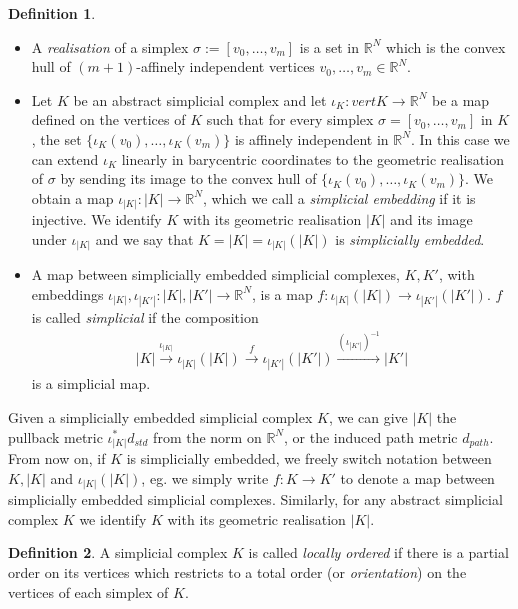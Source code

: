 \documentclass[a4paper,11pt]{article}
\theoremstyle{definition}
\newtheorem{definition}{Definition}[section]
\theoremstyle{plain}
\theoremstyle{remark}
\begin{document}
\begin{definition} \begin{itemize}
\item A \textit{realisation} of a simplex $\sigma:= [v_{0},\dots, v_{m}]$ is a set in $\mathbb{R}^N$ which is the convex hull of $(m+1)$-affinely independent vertices $v_{0},\dots, v_{m} \in \mathbb{R}^N$. 
\item Let $K$ be an abstract simplicial complex and let $\iota_K: vert K \rightarrow \mathbb{R}^N$ be a map defined on the vertices of $K$ such that for every simplex $\sigma = [v_{0},\dots, v_{m}]$ in $K$, the set $\{\iota_K(v_{0}),\dots,\iota_K(v_{m})\}$ is affinely independent in $\mathbb{R}^N$. In this case we can extend $\iota_K$ linearly in barycentric coordinates to the geometric realisation of $\sigma$ by sending its image to the convex hull of $\{\iota_K(v_{0}),\dots, \iota_K(v_{m})\}$.  We obtain a map  $\iota_{|K|}: |K|\rightarrow \mathbb{R}^N$, which we call a \textit{simplicial embedding} if it is injective. We identify $K$ with its geometric realisation $|K|$ and its image under $\iota_{|K|}$ and we say that $K= |K|= \iota_{|K|}(|K|)$ is \textit{simplicially embedded}.
\item A map between simplicially embedded simplicial complexes, $K,K'$, with embeddings $\iota_{|K|},\iota_{|K'|}: |K|,|K'|\rightarrow \mathbb{R}^N$, is a map $f: \iota_{|K|}(|K|) \rightarrow \iota_{|K'|}(|K'|)$. $f$ is called \textit{simplicial} if the composition 
\begin{align*}
|K|\xrightarrow{\iota_{|K|}} \iota_{|K|}(|K|) \xrightarrow{f} \iota_{|K'|}(|K'|) \xrightarrow{(\iota_{|K'|})^{-1}} |K'|
\end{align*}
is a simplicial map. 
\end{itemize}
\end{definition}

Given a simplicially embedded simplicial complex $K$, we can give $|K|$ the pullback metric $\iota^{*}_{|K|} d_{std}$ from the norm on $\mathbb{R}^N$, or the induced path metric $d_{path}$. From now on, if $K$ is simplicially embedded, we freely switch notation between $K,|K|$ and $\iota_{|K|}(|K|)$, eg. we simply write $f:K\rightarrow K'$ to denote a map between simplicially embedded simplicial complexes. Similarly, for any abstract simplicial complex $K$ we identify $K$ with its geometric realisation $|K|$.  

\begin{definition} A simplicial complex $K$ is called \textit{locally ordered} if there is a partial order on its vertices which restricts to a total order (or \textit{orientation}) on the vertices of each simplex of $K$. 
\end{definition}
\end{document}
